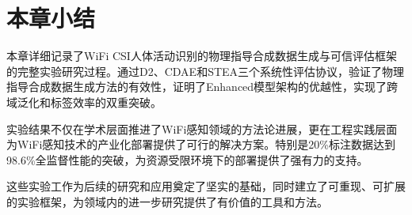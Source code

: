 \section{本章小结}
\label{sec:chapter_summary}

本章详细记录了WiFi CSI人体活动识别的物理指导合成数据生成与可信评估框架的完整实验研究过程。通过D2、CDAE和STEA三个系统性评估协议，验证了物理指导合成数据生成方法的有效性，证明了Enhanced模型架构的优越性，实现了跨域泛化和标签效率的双重突破。

实验结果不仅在学术层面推进了WiFi感知领域的方法论进展，更在工程实践层面为WiFi感知技术的产业化部署提供了可行的解决方案。特别是20\%标注数据达到98.6\%全监督性能的突破，为资源受限环境下的部署提供了强有力的支持。

这些实验工作为后续的研究和应用奠定了坚实的基础，同时建立了可重现、可扩展的实验框架，为领域内的进一步研究提供了有价值的工具和方法。